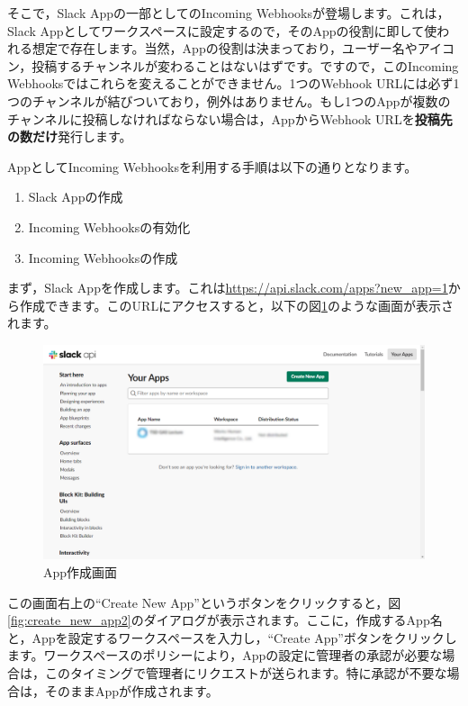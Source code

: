 \documentclass[uplatex,a4j]{jsarticle}
\begin{document}
そこで，Slack Appの一部としてのIncoming Webhooksが登場します。これは，Slack Appとしてワークスペースに設定するので，そのAppの役割に即して使われる想定で存在します。当然，Appの役割は決まっており，ユーザー名やアイコン，投稿するチャンネルが変わることはないはずです。ですので，このIncoming Webhooksではこれらを変えることができません。1つのWebhook URLには必ず1つのチャンネルが結びついており，例外はありません。もし1つのAppが複数のチャンネルに投稿しなければならない場合は，AppからWebhook URLを\textbf{投稿先の数だけ}発行します。

AppとしてIncoming Webhooksを利用する手順は以下の通りとなります。

\begin{enumerate}
\item Slack Appの作成
\item Incoming Webhooksの有効化
\item Incoming Webhooksの作成
\end{enumerate}

まず，Slack Appを作成します。これは\href{https://api.slack.com/apps?new_app=1}{https://api.slack.com/apps?new\_app=1}から作成できます。このURLにアクセスすると，以下の図\ref{fig:create_new_app}のような画面が表示されます。

\begin{figure}[H]
 \centering
 \includegraphics[keepaspectratio, scale=0.45]{images/create_new_app.png}
 \caption{App作成画面}
 \label{fig:create_new_app}
\end{figure}

この画面右上の``Create New App''というボタンをクリックすると，図\ref{fig:create_new_app2}のダイアログが表示されます。ここに，作成するApp名と，Appを設定するワークスペースを入力し，``Create App''ボタンをクリックします。ワークスペースのポリシーにより，Appの設定に管理者の承認が必要な場合は，このタイミングで管理者にリクエストが送られます。特に承認が不要な場合は，そのままAppが作成されます。
\end{document}
